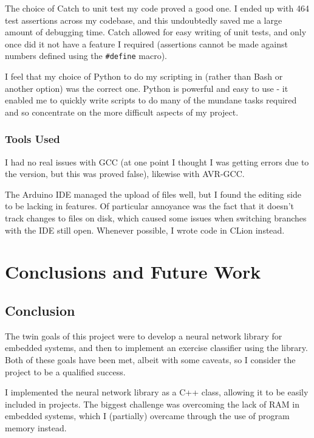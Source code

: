\documentclass[a4paper]{article}
\begin{document}
The choice of Catch to unit test my code proved a good one. I ended up with 464 test assertions across my codebase, and this undoubtedly saved me a large amount of debugging time. Catch allowed for easy writing of unit tests, and only once did it not have a feature I required (assertions cannot be made against numbers defined using the \lstinline{#define} macro).

I feel that my choice of Python to do my scripting in (rather than Bash or another option) was the correct one. Python is powerful and easy to use - it enabled me to quickly write scripts to do many of the mundane tasks required and so concentrate on the more difficult aspects of my project. 

\subsubsection{Tools Used}

I had no real issues with GCC (at one point I thought I was getting errors due to the version, but this was proved false), likewise with AVR-GCC.

The Arduino IDE managed the upload of files well, but I found the editing side to be lacking in features. Of particular annoyance was the fact that it doesn't track changes to files on disk, which caused some issues when switching branches with the IDE still open. Whenever possible, I wrote code in CLion instead.

\newpage
\section{Conclusions and Future Work}

\subsection{Conclusion}%

The twin goals of this project were to develop a neural network library for embedded systems, and then to implement an exercise classifier using the library. Both of these goals have been met, albeit with some caveats, so I consider the project to be a qualified success.

I implemented the neural network library as a C++ class, allowing it to be easily included in projects. The biggest challenge was overcoming the lack of RAM in embedded systems, which I (partially) overcame through the use of program memory instead. 
\end{document}
